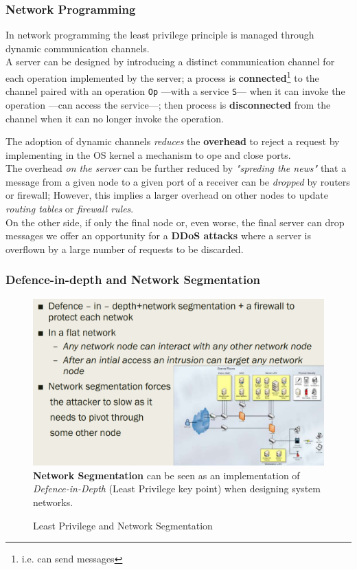 \subsubsection{Network Programming}
In network programming the least privilege principle is
managed through dynamic communication channels.\\
A server can be designed by introducing a distinct communication
channel for each operation implemented by the server; 
a process is \textbf{connected}\footnote{i.e. can send messages} to the channel
paired with an operation \texttt{Op} {---}{with a service \texttt{S}}{---} when it can
invoke the operation {---}{can access the service}{---};
then process is \textbf{disconnected} from the channel when it can no
longer invoke the operation.

The adoption of dynamic channels \textit{reduces} the \textbf{overhead} to reject a request by implementing in the OS kernel a mechanism to ope and close ports.\\
The overhead \textit{on the server} can be further reduced by \textit{"spreding the news"}
that a message from a given node to a given port of a receiver
can be \textit{dropped} by routers or firewall;
However, this implies a larger overhead on other nodes to update \textit{routing tables} or \textit{firewall rules}.\\
On the other side, if only the final node or, even worse, the final
server can drop messages we offer an opportunity for a
\textbf{DDoS attacks} where a server is overflown by a large number of
requests to be discarded.

\subsubsection{Defence-in-depth and Network Segmentation}
\begin{figure}[htbp]
   \centering
   \includegraphics{images/leastprivilege_networkseg.png}\\
   \textbf{Network Segmentation} can be seen as an implementation of \textit{Defence-in-Depth} (Least Privilege key point) when designing system networks.
   \caption{Least Privilege and Network Segmentation}
   \label{fig:leastprivilege_networkseg}
\end{figure}

